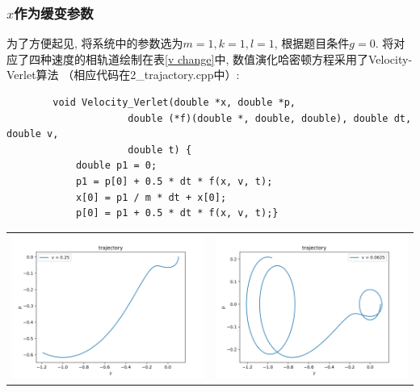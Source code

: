 \documentclass[a4paper,zihao=5,UTF8]{ctexart}
\begin{document}
    \subsubsection{$x$作为缓变参数}
    为了方便起见, 将系统中的参数选为$m = 1, k = 1, l = 1$, 根据题目条件$g=0$.
    将对应了四种速度的相轨道绘制在表\ref{v change}中, 数值演化哈密顿方程采用了Velocity-Verlet算法
    （相应代码在2\_trajactory.cpp中）:
    \begin{lstlisting}
        void Velocity_Verlet(double *x, double *p,
                     double (*f)(double *, double, double), double dt, double v,
                     double t) {
            double p1 = 0;
            p1 = p[0] + 0.5 * dt * f(x, v, t);
            x[0] = p1 / m * dt + x[0];
            p[0] = p1 + 0.5 * dt * f(x, v, t);}
    \end{lstlisting}
    \begin{table}[htbp]
        \centering
        \begin{tabular}[htbp]{cc}
            \includegraphics[scale=0.5]{2_traj_v=0_25.png} & \includegraphics[scale=0.5]{2_traj_v=0_0625.png} \\

\end{tabular}
\end{table}
\end{document}
